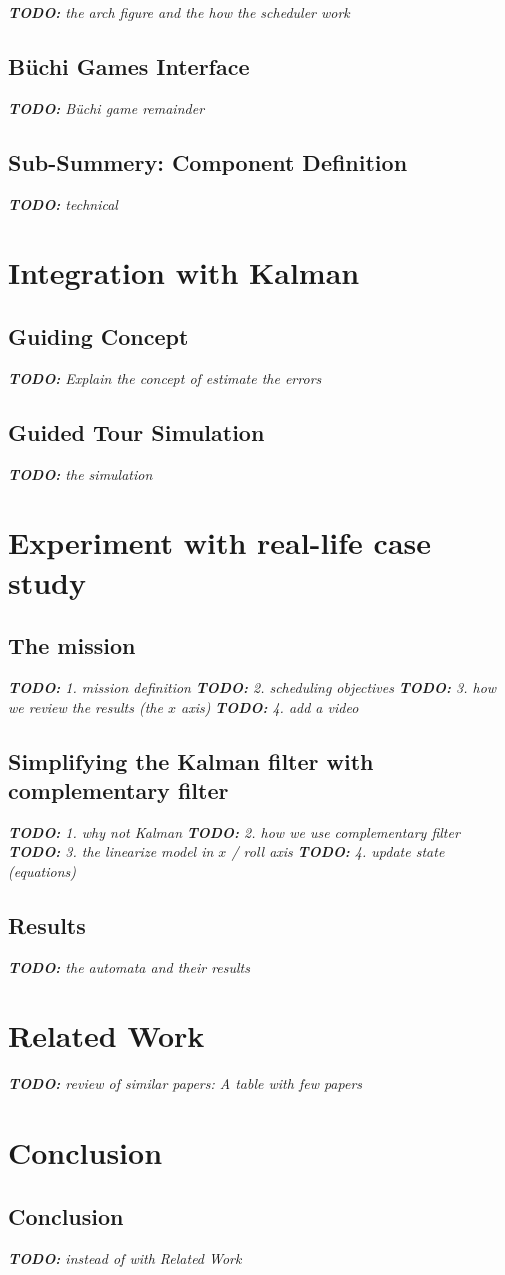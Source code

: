 \documentclass[notes]{beamer}
\newcommand\todoil[1]{ {\color{red}\textit{\textbf{TODO:} #1}} }
\newcommand{\buchi}{B\"uchi }
\begin{document}
    
    \todoil{the arch figure and the how the scheduler work}
\subsection{\buchi Games Interface}
    \todoil{\buchi game remainder}
\subsection{Sub-Summery: Component Definition}
    \todoil{technical}
    
    
\section{Integration with Kalman}
\subsection{Guiding Concept}
    \todoil{Explain the concept of estimate the errors}
\subsection{Guided Tour Simulation}
    \todoil{the simulation}
    

\section{Experiment with real-life case study}
\subsection{The mission}
    \todoil{1. mission definition}
    \todoil{2. scheduling objectives}
    \todoil{3. how we review the results (the $x$ axis)}
    \todoil{4. add a video}
\subsection{Simplifying the Kalman filter with complementary filter}
    \todoil{1. why not Kalman}
    \todoil{2. how we use complementary filter}
    \todoil{3. the linearize model in $x$ / roll axis}
    \todoil{4. update state (equations)}
\subsection{Results}
    \todoil{the automata and their results}

\section{Related Work}
    \todoil{review of similar papers: A table with few papers}

\section{Conclusion}
\subsection{Conclusion}
    \todoil{instead of with Related Work}
\end{document}
